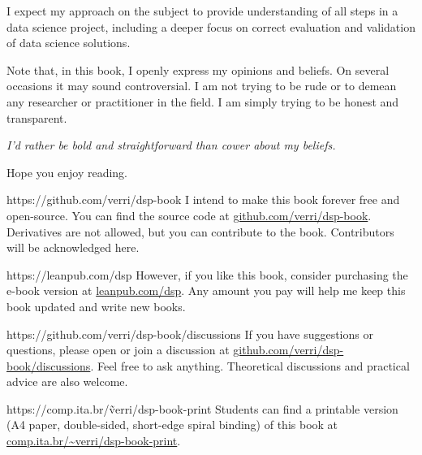 I expect my approach on the subject to provide understanding of all steps in a data
science project, including a deeper focus on correct evaluation and validation of data
science solutions.

Note that, in this book, I openly express my opinions and beliefs. On several occasions it
may sound controversial.  I am not trying to be rude or to demean any researcher or
practitioner in the field.  I am simply trying to be honest and transparent.

\vspace{1em}
\emph{I'd rather be bold and straightforward than cower about my beliefs.}
\vspace{1em}

Hope you enjoy reading.

\newpage

\begin{parwithqr}{https://github.com/verri/dsp-book}
  I intend to make this book forever free and open-source. You can find the source code at
  \href{\aurl}{github.com/verri/dsp-book}. Derivatives are not allowed, but you can
  contribute to the book. Contributors will be acknowledged here.
\end{parwithqr}

\vfill

\begin{lparwithqr}{https://leanpub.com/dsp}
  However, if you like this book, consider purchasing the e-book version at
  \href{\aurl}{leanpub.com/dsp}. Any amount you pay will help me keep this book updated
  and write new books.
\end{lparwithqr}

\vfill

\begin{parwithqr}{https://github.com/verri/dsp-book/discussions}
  If you have suggestions or questions, please open or join a discussion at
  \href{\aurl}{github.com/verri/dsp-book/discussions}. Feel free to ask anything.
  Theoretical discussions and practical advice are also welcome.
\end{parwithqr}

\vfill

\begin{lparwithqr}{https://comp.ita.br/\~verri/dsp-book-print}
  Students can find a printable version (A4 paper, double-sided, short-edge spiral
  binding) of this book at
  \href{\aurl}{comp.ita.br/\textasciitilde{}verri/dsp-book-print}.
\end{lparwithqr}

